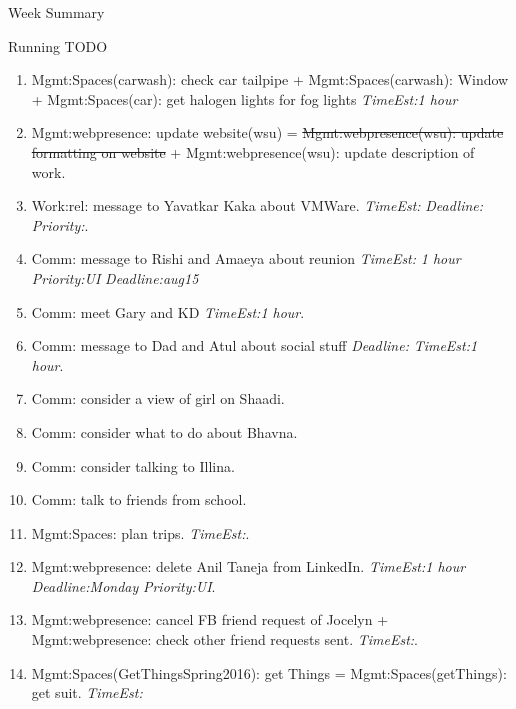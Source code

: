 \documentclass[serif, mathserif, final]{beamer}
\newcommand{\doneTaskNoItem}[1]{\sout{#1}}
\newcommand{\te}[1]{\textit{TimeEst:}\textit{#1}}
\newcommand{\dl}[1]{\textit{Deadline:}\textit{#1}}
\newcommand{\pr}[1]{\textit{Priority:}\textit{#1}}
\begin{document}
\begin{frame}
\begin{columns}
\begin{column}{0.5\linewidth}
\begin{block}{Week Summary}
\begin{block}{Running TODO}
\begin{enumerate}
      \item \tiny Mgmt:Spaces(carwash): check car tailpipe + 
        Mgmt:Spaces(carwash): Window + Mgmt:Spaces(car): get halogen
        lights for fog lights \te{1 hour} 
  
      \item \tiny Mgmt:webpresence: update website(wsu) =
        \doneTaskNoItem{Mgmt:webpresence(wsu): update formatting on
          website} + Mgmt:webpresence(wsu): update description of work.
       
        
      \item \tiny Work:rel: message to Yavatkar Kaka about
        VMWare. \te{} \dl{} \pr{}. 
        
        
\item \tiny Comm: message to Rishi and Amaeya about reunion \te{ 1
  hour} \pr{UI}  \dl{aug15}  
          
\item \tiny Comm: meet Gary and KD \te{1 hour}. 
  
\item \tiny Comm: message to Dad and Atul about social stuff \dl{} \te{1 hour}.  
          
\item \tiny Comm: consider a view of girl on Shaadi. 
\item \tiny Comm: consider what to do about Bhavna. 
\item \tiny Comm: consider talking to Illina. 
\item \tiny Comm: talk to friends from school.
\item \tiny Mgmt:Spaces: plan trips. \te{}. 
\item \tiny Mgmt:webpresence: delete Anil Taneja from
  LinkedIn. \te{1 hour} \dl{Monday} \pr{UI}.
\item \tiny Mgmt:webpresence: cancel FB friend request of
  Jocelyn + Mgmt:webpresence: check other friend requests
  sent. \te{}.
\item \tiny Mgmt:Spaces(GetThingsSpring2016): get Things =
  Mgmt:Spaces(getThings): get suit. \te{}
        \end{enumerate}
      \end{block}
      



\end{block}
\end{column}
\end{columns}
\end{frame}
\end{document}
